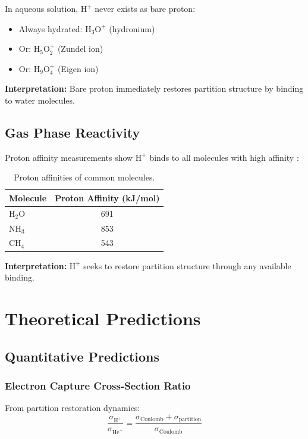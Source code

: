 \documentclass[12pt,a4paper]{article}
\begin{document}
In aqueous solution, $\text{H}^+$ never exists as bare proton:

\begin{itemize}
\item Always hydrated: $\text{H}_3\text{O}^+$ (hydronium)
\item Or: $\text{H}_5\text{O}_2^+$ (Zundel ion)
\item Or: $\text{H}_9\text{O}_4^+$ (Eigen ion)
\end{itemize}

\textbf{Interpretation:} Bare proton immediately restores partition structure by binding to water molecules.

\subsection{Gas Phase Reactivity}

Proton affinity measurements show $\text{H}^+$ binds to all molecules with high affinity \cite{Hunter1998}:

\begin{table}[h]
\centering
\begin{tabular}{lc}
\toprule
Molecule & Proton Affinity (kJ/mol) \\
\midrule
H$_2$O & 691 \\
NH$_3$ & 853 \\
CH$_4$ & 543 \\
\bottomrule
\end{tabular}
\caption{Proton affinities of common molecules.}
\label{tab:protonaffinity}
\end{table}

\textbf{Interpretation:} $\text{H}^+$ seeks to restore partition structure through any available binding.

\section{Theoretical Predictions}

\subsection{Quantitative Predictions}

\subsubsection{Electron Capture Cross-Section Ratio}

From partition restoration dynamics:
$$
\frac{\sigma_{\text{H}^+}}{\sigma_{\text{He}^+}} = \frac{\sigma_{\text{Coulomb}} + \sigma_{\text{partition}}}{\sigma_{\text{Coulomb}}}
$$
\end{document}
